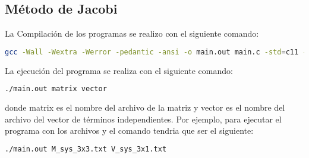 \subsection{Método de Jacobi}

La Compilación de los programas se realizo con el siguiente comando:

\begin{lstlisting}[language=bash]
    gcc -Wall -Wextra -Werror -pedantic -ansi -o main.out main.c -std=c11 -lm
\end{lstlisting}

La ejecución del programa se realiza con el siguiente comando:

\begin{lstlisting}[language=bash]
    ./main.out matrix vector
\end{lstlisting}

donde matrix es el nombre del archivo de la matriz y vector es el nombre del archivo del vector de términos independientes. Por ejemplo, para ejecutar el programa con los archivos  y  el comando tendria que ser el siguiente:

\begin{lstlisting}[language=bash]
    ./main.out M_sys_3x3.txt V_sys_3x1.txt
\end{lstlisting}